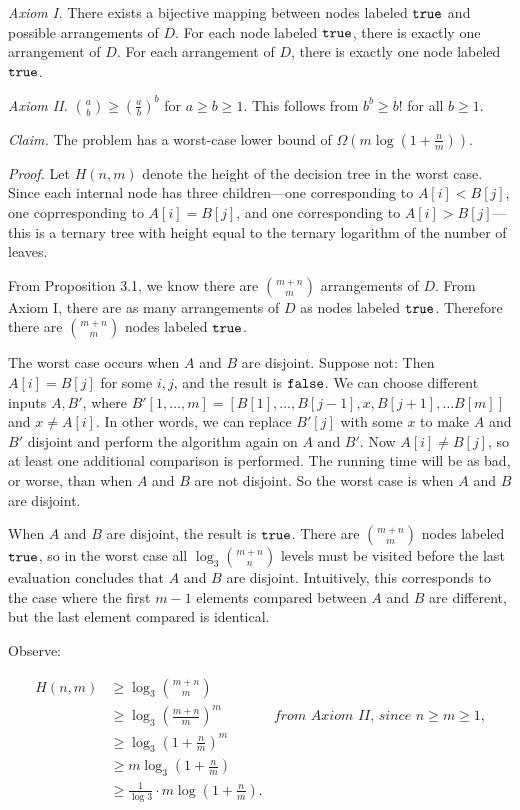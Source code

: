 \begin{enumerate}
\begin{solution}
\textit{Axiom I. }There exists a bijective mapping between nodes labeled $\mathtt{true}$ and possible arrangements of $D$. For each node labeled $\mathtt{true}$, there is exactly one arrangement of $D$. For each arrangement of $D$, there is exactly one node labeled $\mathtt{true}$.

\textit{Axiom II. }$\binom{a}{b}\geq\left(\frac{a}{b}\right)^b$ for $a\geq b\geq 1$. This follows from $b^b\geq b!$ for all $b\geq 1$.

\textit{Claim. }The problem has a worst-case lower bound of $\Omega\left(m\log\left(1+\frac{n}{m}\right)\right)$.

\textit{Proof. }Let $H(n,m)$ denote the height of the decision tree in the worst case. Since each internal node has three children---one corresponding to $A[i]<B[j]$, one coprresponding to $A[i]=B[j]$, and one corresponding to $A[i]>B[j]$---this is a ternary tree with height equal to the ternary logarithm of the number of leaves.

From Proposition 3.1, we know there are $\binom{m+n}{m}$ arrangements of $D$. From Axiom I, there are as many arrangements of $D$ as nodes labeled $\mathtt{true}$. Therefore there are $\binom{m+n}{m}$ nodes labeled $\mathtt{true}$.

The worst case occurs when $A$ and $B$ are disjoint. Suppose not: Then $A[i]=B[j]$ for some $i,j$, and the result is $\mathtt{false}$. We can choose different inputs $A,B'$, where $B'[1,\dots,m]=[B[1],\dots,B[j-1],x,B[j+1],\dots B[m]]$ and $x\neq A[i]$. In other words, we can replace $B'[j]$ with some $x$ to make $A$ and $B'$ disjoint and perform the algorithm again on $A$ and $B'$. Now $A[i]\neq B[j]$, so at least one additional comparison is performed. The running time will be as bad, or worse, than when $A$ and $B$ are not disjoint. So the worst case is when $A$ and $B$ are disjoint.

When $A$ and $B$ are disjoint, the result is $\mathtt{true}$. There are $\binom{m+n}{m}$ nodes labeled $\mathtt{true}$, so in the worst case all $\log_3\binom{m+n}{n}$ levels must be visited before the last evaluation concludes that $A$ and $B$ are disjoint. Intuitively, this corresponds to the case where the first $m-1$ elements compared between $A$ and $B$ are different, but the last element compared is identical.

Observe:

\begin{align*}
H(n,m)&\geq\log_3\binom{m+n}{m}\\
&\geq\log_3\left(\frac{m+n}{m}\right)^m&\textit{from Axiom II, since $n\geq m\geq 1$,}\\
&\geq\log_3\left(1+\frac{n}{m}\right)^m\\
&\geq m\log_3\left(1+\frac{n}{m}\right)\\
&\geq\frac{1}{\log{3}}\cdot m\log\left(1+\frac{n}{m}\right).
\end{align*}


\end{solution}
\end{enumerate}
